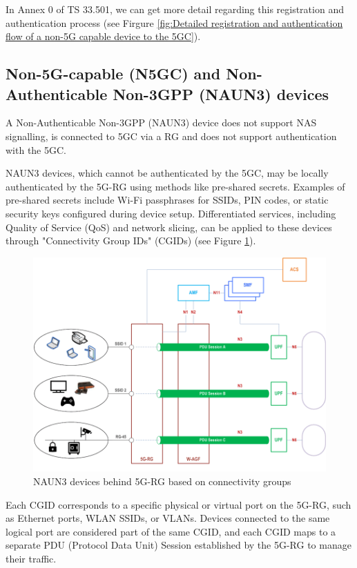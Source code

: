 In Annex 0 of TS 33.501, we can get more detail regarding this registration and authentication process (see Firgure \ref{fig:Detailed registration and authentication flow of a non-5G capable device to the 5GC}).

\subsection{Non-5G-capable (N5GC) and Non-Authenticable Non-3GPP (NAUN3) devices}

A Non-Authenticable Non-3GPP (NAUN3) device does not support NAS signalling, is connected to 5GC via a RG and does not support authentication with the 5GC.%

NAUN3 devices, which cannot be authenticated by the 5GC, may be locally authenticated by the 5G-RG using methods like pre-shared secrets. Examples of pre-shared secrets include Wi-Fi passphrases for SSIDs, PIN codes, or static security keys configured during device setup. Differentiated services, including Quality of Service (QoS) and network slicing, can be applied to these devices through "Connectivity Group IDs" (CGIDs) (see Figure \ref{fig:NAUN3 devices behind 5G-RG based on connectivity groups}).

\begin{figure}
    \centering
    \includegraphics[width=0.75\linewidth]{figs/NAUN3 devices behind 5G-RG based on connectivity groups.png}
    \caption{NAUN3 devices behind 5G-RG based on connectivity groups}
    \label{fig:NAUN3 devices behind 5G-RG based on connectivity groups}
\end{figure}

Each CGID corresponds to a specific physical or virtual port on the 5G-RG, such as Ethernet ports, WLAN SSIDs, or VLANs. Devices connected to the same logical port are considered part of the same CGID, and each CGID maps to a separate PDU (Protocol Data Unit) Session established by the 5G-RG to manage their traffic.

